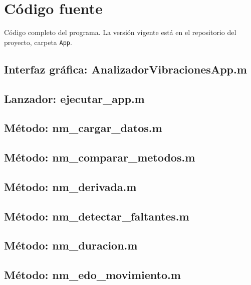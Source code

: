 \section{Código fuente}
\label{app:codigo}

Código completo del programa. La versión vigente está en el repositorio del proyecto, carpeta \texttt{App}.

\subsection*{Interfaz gráfica: AnalizadorVibracionesApp.m}


\subsection*{Lanzador: ejecutar\_app.m}


\subsection*{Método: nm\_cargar\_datos.m}


\subsection*{Método: nm\_comparar\_metodos.m}


\subsection*{Método: nm\_derivada.m}


\subsection*{Método: nm\_detectar\_faltantes.m}


\subsection*{Método: nm\_duracion.m}


\subsection*{Método: nm\_edo\_movimiento.m}


